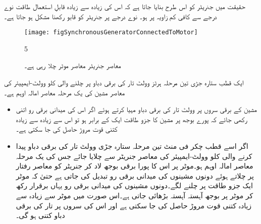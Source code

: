 حقیقت میں جنریٹر کو اس طرح بنایا جاتا ہے کہ اس کی زیادہ سے زیادہ قابلِ استعمال طاقت نوے درجے سے کافی کم زاویہ پر ہو۔ نوے درجے پر جنریٹر کو قابو رکھنا مشکل ہو جاتا ہے۔
%
\begin{figure}
\centering
\texttt{[image: figSynchronousGeneratorConnectedToMotor]}
\caption{معاصر جنریٹر معاصر موٹر چلا رہی ہے۔}
\label{شکل_معاصر_جنریٹر_موٹر_چلاتا_ہوا}
5\end{figure}
ایک  قطب ستارہ جڑی تین مرحلہ  ہرٹز  وولٹ تار کی برقی دباو پر چلنے والی  کلو وولٹ-ایمپیئر کی معاصر مشین کی یک مرحلہ  معاصر امالہ  اوہم ہے۔
\begin{itemize}
\item
مشین کے برقی سروں پر  وولٹ تار کی برقی دباو مہیا کرتے ہوئے اگر اس کی میدانی برقی رو اتنی رکھی جائے کہ پورے بوجھ پر مشین کا جزو طاقت ایک کے برابر ہو تو اس سے زیادہ سے زیادہ کتنی قوت مروڑ حاصل کی جا سکتی ہے۔
\item
اگر اسے    قطب   چکر فی منٹ تین مرحلہ ستارہ جڑی  وولٹ تار کی برقی دباو پیدا کرنے والی   کلو وولٹ-ایمپیئر کی معاصر جنریٹر سے چلایا جائے جس کی یک مرحلہ معاصر امالہ  اوہم ہو۔موٹر پر اس کا پورا برقی بوجھ لاد کر جنریٹر کو معاصر رفتار پر چلاتے ہوئے دونوں مشینوں کی میدانی برقی رو تبدیل کی جاتی ہے حتیٰ کہ موٹر ایک جزو طاقت پر چلنے لگے۔دونوں مشینوں کی میدانی برقی رو یہاں برقرار رکھ کر موٹر پر بوجھ آہستہ آہستہ بڑھائی جاتی ہے۔اس صورت میں موٹر سے زیادہ سے زیادہ کتنی قوت مروڑ  حاصل کی جا سکتی ہے اور اس کی سروں پر تار کی برقی دباو کتنی ہو گی۔ 
\end{itemize}

